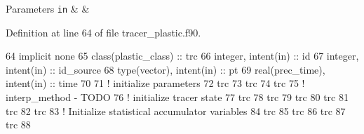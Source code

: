 \begin{DoxyParams}[1]{Parameters}
\mbox{\tt in}  & {\em } & \\
\hline
\end{DoxyParams}


Definition at line 64 of file tracer\+\_\+plastic.\+f90.


\begin{DoxyCode}
64     \textcolor{keywordtype}{implicit none}
65     \textcolor{keywordtype}{class}(plastic\_class) :: trc
66     \textcolor{keywordtype}{integer}, \textcolor{keywordtype}{intent(in)} :: id
67     \textcolor{keywordtype}{integer}, \textcolor{keywordtype}{intent(in)} :: id\_source
68     \textcolor{keywordtype}{type}(vector), \textcolor{keywordtype}{intent(in)} :: pt
69     \textcolor{keywordtype}{real(prec\_time)}, \textcolor{keywordtype}{intent(in)} :: time
70 
71     \textcolor{comment}{! initialize parameters}
72     trc%
73     trc%
74     trc%
75     \textcolor{comment}{! interp\_method - TODO}
76     \textcolor{comment}{! initialize tracer state}
77     trc%
78     trc%
79     trc%
80     trc%
81     trc%
82     trc%
83     \textcolor{comment}{! Initialize statistical accumulator variables}
84     trc%
85     trc%
86     trc%
87     trc%
88 
\end{DoxyCode}
